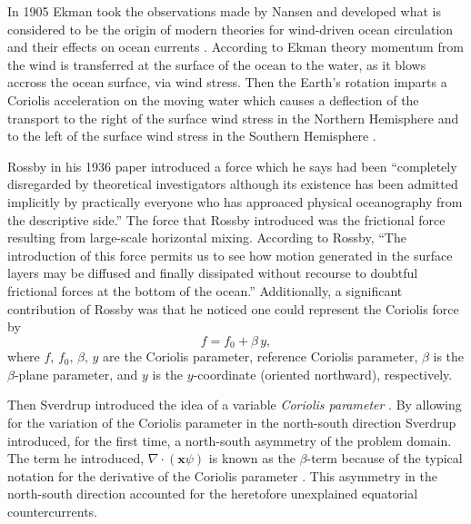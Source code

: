 In 1905 Ekman\cite{Ekman1905} took the observations made by Nansen and developed
what is considered to be the origin of modern theories for wind-driven ocean
circulation and their effects on ocean currents \cite{Price1987}. According to
Ekman theory momentum from the wind is transferred at the surface of the ocean
to the water, as it blows accross the ocean surface, via wind stress. Then the
Earth's rotation imparts a Coriolis acceleration on the moving water which
causes a deflection of the transport to the right of the surface wind stress in
the Northern Hemisphere and to the left of the surface wind stress in the
Southern Hemisphere \cite{Beesley2008}.

Rossby in his 1936 paper\cite{Rossby1936} introduced a force which he says had
been ``completely disregarded by theoretical investigators although its
existence has been admitted implicitly by practically everyone who has approaced
physical oceanography from the descriptive side.'' The force that Rossby
introduced was the frictional force resulting from large-scale horizontal
mixing. According to Rossby, ``The introduction of this force permits us to see
how motion generated in the surface layers may be diffused and finally
dissipated without recourse to doubtful frictional forces at the bottom of the
ocean.'' Additionally, a significant contribution of Rossby was that he noticed
one could represent the Coriolis force by \cite{James2009}
\begin{equation}
  f = f_0 + \beta\, y,
  \label{eqn:CoriolisParameterization}
\end{equation}
where $f,\, f_0,\, \beta,\, y$ are the Coriolis parameter, reference Coriolis
parameter, $\beta$ is the $\beta$-plane parameter, and $y$ is the $y$-coordinate
(oriented northward), respectively.

Then Sverdrup introduced the idea of a variable \emph{Coriolis parameter}
\cite{Fox-Kemper2003}. By allowing for the variation of the Coriolis parameter
in the north-south direction Sverdrup\cite{Sverdrup1947} introduced, for the
first time, a north-south asymmetry of the problem domain. The term he
introduced, $\nabla \cdot (\mathbf{x} \psi)$ is known as the $\beta$-term
because of the typical notation for the derivative of the Coriolis parameter
\cite{Fox-Kemper2003}. This asymmetry in the north-south direction accounted for
the heretofore unexplained equatorial countercurrents.

